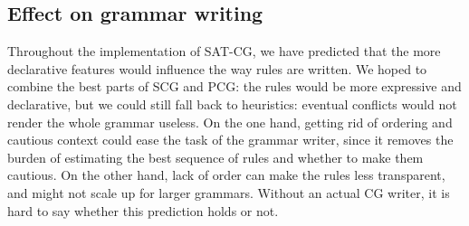 


\subsection{Effect on grammar writing}


Throughout the implementation of SAT-CG, we have predicted that the more declarative features would influence the way rules are written. 
We hoped to combine the best parts of SCG and PCG: 
the rules would be more expressive and declarative, 
but we could still fall back to heuristics: eventual 
conflicts would not render the whole grammar useless.
On the one hand, getting rid of ordering and cautious context could ease the task of the grammar writer, since it removes the burden of estimating the best sequence of rules and whether to make them cautious. On the other hand, lack of order can make the rules less transparent, and might not scale up for larger grammars.
Without an actual CG writer, it is hard to say whether this prediction holds or not.

